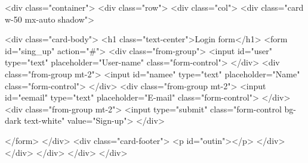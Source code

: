 <div class="container">
<div class="row">
    <div class="col">
    <div class="card w-50 mx-auto shadow">
        
        <div class="card-body">
            <h1 class="text-center">Login form</h1>
        <form id="sing_up" action="#">
            <div class="from-group">
                <input id="user" type="text" placeholder="User-name" class="form-control">
            </div>
            <div class="from-group mt-2">
                <input id="namee" type="text" placeholder="Name" class="form-control">
            </div>
            <div class="from-group mt-2">
                <input id="eemail" type="text" placeholder="E-mail" class="form-control">
            </div>
            <div class="from-group mt-2">
                <input  type="submit" class="form-control bg-dark text-white" value="Sign-up">
            </div>
          
        </form>
        </div>
        <div class="card-footer">
            <p id="outin"></p>
        </div>
    </div>
    </div>
</div>
</div>